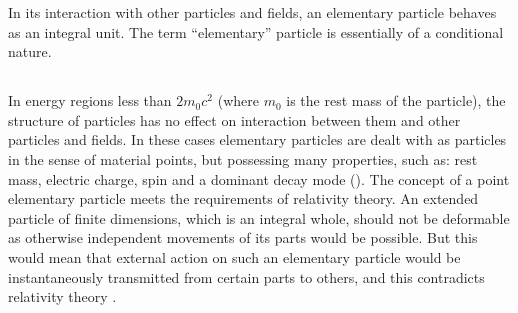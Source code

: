 
In its interaction with other particles and fields, an elementary particle behaves as an integral unit. The term ``elementary'' particle is essentially of a conditional nature.
\label{tab-43.1}

\setcounter{page}{997}

\subsection{}\label{43.1.2} In energy regions less than $2m_{0}c^{2}$ (where $m_{0}$ is the rest mass of the particle), the structure of particles has no effect on interaction between them and other particles and fields. In
these cases elementary particles are dealt with as particles in the sense of material points, but possessing many properties, such as: rest mass, electric charge, spin and a dominant decay mode (). The concept of a point elementary particle meets the requirements of relativity theory. An extended particle of finite dimensions, which is an integral whole, should not be deformable as otherwise independent movements of its parts would be possible. But this would mean that external action on such an elementary particle would be instantaneously transmitted from certain parts to others, and this contradicts relativity theory .

